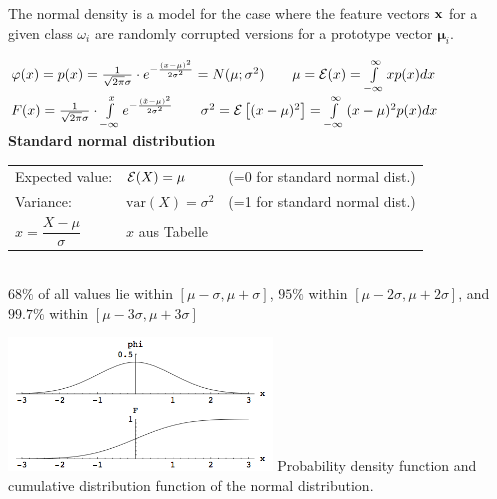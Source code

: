   The normal density is a model for the case where the feature vectors $\mathbf{x}$ 
  for a given class $\omega_i$ are randomly corrupted versions for a prototype vector $\boldsymbol{\mu}_i$.
  
  \begin{minipage}{11.5cm}
  $\varphi(x)=p(x)=\frac{1}{\sqrt{2
  \pi}\sigma}\cdot e^{-\frac{(x-\mu)^2}{2\sigma^2}} = N(\mu ; \sigma^2) \qquad \mu=\operatorname{\mathcal{E}}(x)=\int\limits_{-\infty}^{\infty}{x p(x) dx}$\\ 
  $F(x)=\frac{1}{\sqrt{2
  \pi}\sigma}\cdot \int\limits^{x}_{-\infty}{e^{-\frac{(\tilde{x} -\mu)^2}{2\sigma^2}}} \qquad \sigma^2=\operatorname{\mathcal{E}}\left[(x-\mu)^2\right]=\int\limits_{-\infty}^{\infty}{(x-\mu)^2 p(x) dx}$ \\
  
  \textbf{Standard normal distribution}\\
  
  \begin{tabular}{lll}
      Expected value: & $\operatorname{\mathcal{E}}(X)=\mu$ & (=0 for standard normal dist.)\\ 
      Variance: & $\mathrm{var}(X)=\sigma^2$ & (=1 for standard normal dist.)\\
      $x=\dfrac{X-\mu}{\sigma}$ & $x$ aus Tabelle & \\
  \end{tabular} \\
  $ 68\% $ of all values lie within $[ \mu - \sigma, \mu + \sigma]$,
  $ 95\% $ within $[ \mu - 2\sigma, \mu + 2\sigma]$, and 
   $99.7\% $ within $[ \mu - 3\sigma, \mu + 3\sigma]$
  \end{minipage}\hspace{0.5cm}
  \begin{minipage}{7cm}
  \includegraphics[width=7cm]{images/normalverteilung.png}
  Probability density function and cumulative distribution function of the normal distribution. 
  \end{minipage} \\ \\ 




